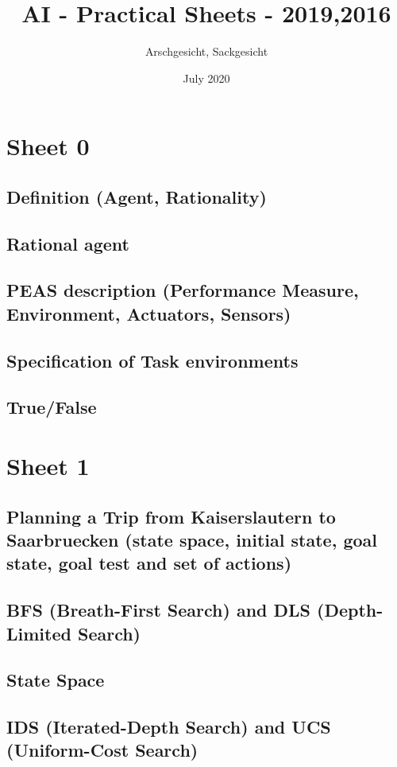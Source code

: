 \documentclass{article}
\title{AI - Practical Sheets - 2019,2016}
\author{Arschgesicht, Sackgesicht}
\date{July 2020}
\begin{document}
\maketitle

\tableofcontents
\newpage


\section{Sheet 0}
    \subsection{Definition (Agent, Rationality)}
    \subsection{Rational agent}
    \subsection{PEAS description (Performance Measure, Environment, Actuators, Sensors)}
    \subsection{Specification of Task environments}
    \subsection{True/False}
    

\section{Sheet 1}
    \subsection{Planning a Trip from Kaiserslautern to Saarbruecken (state space, initial state, goal state, goal test and set of actions)}
    \subsection{BFS (Breath-First Search) and DLS (Depth-Limited Search)}
    \subsection{State Space}
    \subsection{IDS (Iterated-Depth Search) and UCS (Uniform-Cost Search)}
    
    
\end{document}
